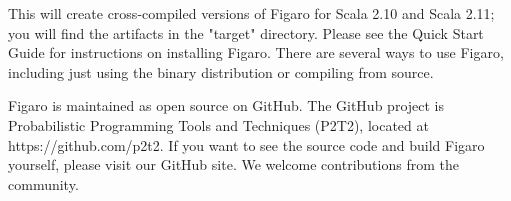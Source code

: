 


This will create cross-compiled versions of Figaro for Scala 2.10 and Scala 2.11; you will find the artifacts in the "target" directory.
Please see the Quick Start Guide for instructions on installing Figaro. There are several ways to use Figaro, including just using the binary distribution or compiling from source.

Figaro is maintained as open source on GitHub. The GitHub project is Probabilistic Programming Tools and Techniques (P2T2), located at https://github.com/p2t2. If you want to see the source code and build Figaro yourself, please visit our GitHub site. We welcome contributions from the community.

